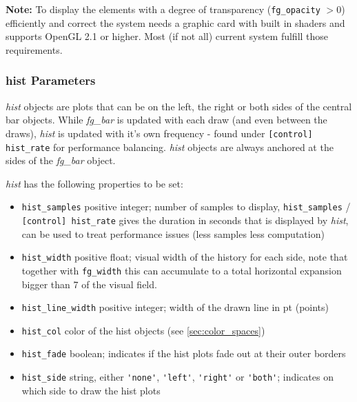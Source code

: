 \documentclass[12pt,a4paper]{book}
\begin{document}

\textbf{Note:} To display the elements with a degree of transparency (\verb|fg_opacity| $ > 0$) efficiently and correct the system needs a graphic card with built in shaders and supports OpenGL 2.1 or higher. Most (if not all) current system fulfill those requirements.

\subsubsection{hist Parameters}

\textit{hist} objects are plots that can be on the left, the right or both sides of the central bar objects. While \textit{fg\_bar} is updated with each draw (and even between the draws), \textit{hist} is updated with it's own frequency - found under \verb|[control] hist_rate| for performance balancing. \textit{hist} objects are always anchored at the sides of the \textit{fg\_bar} object.

\textit{hist} has the following properties to be set:
\begin{itemize}
\item \verb|hist_samples| positive integer; number of samples to display, \verb|hist_samples| / \verb|[control] hist_rate| gives the duration in seconds that is displayed by \textit{hist}, can be used to treat performance issues (less samples less computation)
\item \verb|hist_width| positive float; visual width of the history for each side, note that together with \verb|fg_width| this can accumulate to a total horizontal expansion bigger than 7 \degree of the visual field.
\item \verb|hist_line_width| positive integer; width of the drawn line in pt (points)
\item \verb|hist_col| color of the hist objects (see \ref{sec:color_spaces})
\item \verb|hist_fade| boolean; indicates if the hist plots fade out at their outer borders
\item \verb|hist_side| string, either \verb|'none'|, \verb|'left'|, \verb|'right'| or \verb|'both'|; indicates on which side to draw the hist plots
\end{itemize}

\end{document}
